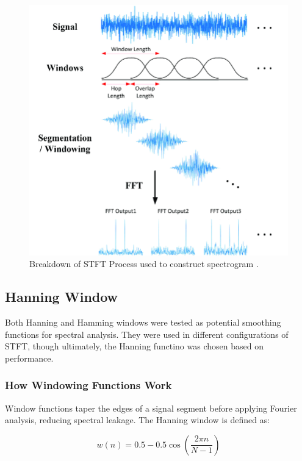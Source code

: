 \documentclass{article}
\begin{document}
\begin{figure}[H]
\includegraphics[width=\textwidth,scale=0.5]{images/STFT.png}
\caption{Breakdown of STFT Process used to construct spectrogram \cite{STFT}.}
\end{figure}

\newpage

\subsection{Hanning Window}
Both Hanning \cite{hanning} and Hamming \cite{onset-detection} windows were tested as potential smoothing functions for spectral analysis. They were used in different configurations of STFT, though ultimately, the Hanning functino was chosen based on performance.

\subsubsection{How Windowing Functions Work}
Window functions taper the edges of a signal segment before applying Fourier analysis, reducing spectral leakage. The Hanning window is defined as:

\begin{equation}
w(n) = 0.5 - 0.5\cos\left(\frac{2\pi n}{N-1}\right)
\end{equation}
\end{document}
